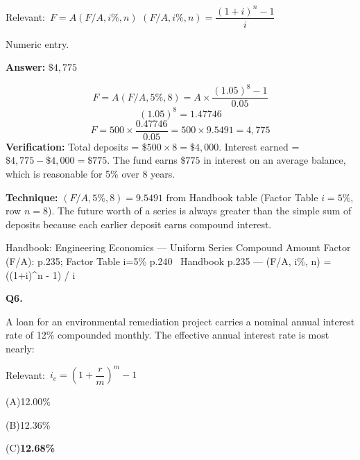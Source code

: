 \documentclass[11pt]{article}
\newcommand{\correct}[1]{\textbf{#1}\;{\color{accent}$\checkmark$}}
\newcommand{\optline}[2]{\par\noindent\hspace{1.2em}(#1)\hspace{0.6em}#2}
\begin{document}
{\small\color{soft}Relevant:}\ $F = A(F/A, i\%, n)$ \quad $(F/A, i\%, n) = \dfrac{(1+i)^n - 1}{i}$\par\vspace{3pt}
{\small\color{soft}Numeric entry.}\par\vspace{3pt}
\vspace{2pt}\par\noindent\colorbox{boxbg}{\parbox{\dimexpr\linewidth-2\fboxsep\relax}{%
\vspace{2pt}\textbf{Answer:} $\$4{,}775$\par\vspace{2pt}
{\small \[F = A(F/A, 5\%, 8) = A \times \frac{(1.05)^8 - 1}{0.05}\]
\[(1.05)^8 = 1.47746\]
\[F = 500 \times \frac{0.47746}{0.05} = 500 \times 9.5491 = 4{,}775\]
\textbf{Verification:} Total deposits = $\$500 \times 8 = \$4{,}000$. Interest earned = $\$4{,}775 - \$4{,}000 = \$775$. The fund earns $\$775$ in interest on an average balance, which is reasonable for 5\% over 8 years.\par
\textbf{Technique:} $(F/A, 5\%, 8) = 9.5491$ from Handbook table (Factor Table $i = 5\%$, row $n = 8$). The future worth of a series is always greater than the simple sum of deposits because each earlier deposit earns compound interest.\par}\par\vspace{2pt}
{\footnotesize\color{soft}Handbook: Engineering Economics --- Uniform Series Compound Amount Factor (F/A): p.235; Factor Table i=5\% p.240 \textbullet\ Handbook p.235 --- (F/A, i\%, n) = ((1+i)\textasciicircum{}n - 1) / i}\vspace{2pt}
}}
\vspace{9pt}
\filbreak
\textbf{\color{accent}Q6.}\par\vspace{2pt}
A loan for an environmental remediation project carries a nominal annual interest rate of 12\% compounded monthly. The effective annual interest rate is most nearly:\par\par\vspace{3pt}
{\small\color{soft}Relevant:}\ $i_e = \left(1 + \dfrac{r}{m}\right)^m - 1$\par\vspace{3pt}
\optline{A}{12.00\%}
\optline{B}{12.36\%}
\optline{C}{\correct{12.68\%}}
\end{document}
